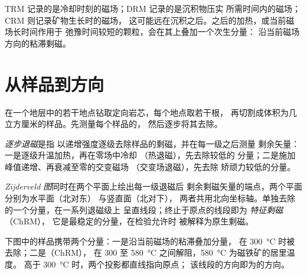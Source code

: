 TRM 记录的是冷却时刻的磁场；DRM 记录的是沉积物压实
所需时间内的磁场；CRM 则记录矿物生长时的磁场，
这可能远在沉积之后。之后的加热，或当前磁场长时间作用于
弛豫时间较短的颗粒，会在其上叠加一个次生分量：
沿当前磁场方向的粘滞剩磁。

\section{从样品到方向}

在一个地层中的若干地点钻取定向岩芯，每个地点取若干根，
再切割成体积为几立方厘米的样品。先测量每个样品的，
然后逐步将其去除。

\begin{definition}[逐步退磁]\label{def:b3:palaeomagnetism:demag}
\emph{逐步退磁}是指
以递增强度逐级去除样品的剩磁，并在每一级之后测量
剩余矢量：一是逐级升温加热，再在零场中冷却
（热退磁），先去除较低的
分量；二是施加峰值递增、再衰减至零的交变磁场
（交变场退磁），先去除
矫顽力较低的分量。
\end{definition}

\begin{definition}\label{def:b3:palaeomagnetism:zijderveld}
\emph{Zijderveld 图}同时在两个平面上绘出每一级退磁后
剩余剩磁矢量的端点，两个平面分别为水平面（北对东）
与竖直面（北对下），
两者共用北向坐标轴。单独去除的一个分量，在一系列退磁级上
呈直线段；终止于原点的线段即为
\emph{特征剩磁}（ChRM），
它是最稳定的分量，在检验允许时
被解释为原生剩磁。
\end{definition}

下图中的样品携带两个分量：一是沿当前磁场的粘滞叠加分量，
在 \qty{300}{\celsius} 时被去除；二是（ChRM），
在 300 至 \qty{580}{\celsius} 之间解阻，\qty{580}{\celsius} 为磁铁矿的居里温度。
高于 \qty{300}{\celsius} 时，两个投影都直线指向原点；
该线段的方向即为的方向。

